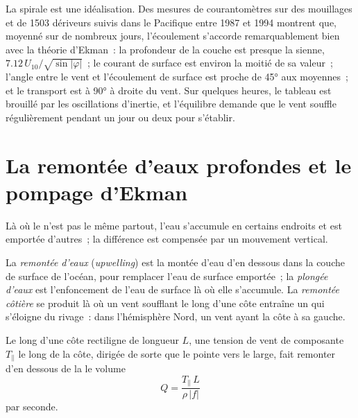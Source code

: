 La spirale est une idéalisation. Des mesures de courantomètres sur des mouillages et
de 1503 dériveurs suivis dans le Pacifique entre 1987 et 1994 montrent que, moyenné
sur de nombreux jours, l'écoulement s'accorde remarquablement bien avec la théorie d'Ekman~: la profondeur de la
couche est presque la sienne, $7.12\,U_{10}/\sqrt{\sin|\varphi|}$~; le courant de surface est
environ la moitié de sa valeur~; l'angle entre le vent et l'écoulement de surface est proche de
\ang{45} aux  moyennes~; et le transport est à \ang{90} à droite du vent.
Sur quelques heures, le tableau est brouillé par les oscillations d'inertie, et l'équilibre
demande que le vent souffle régulièrement pendant un jour ou deux pour s'établir.

\section{La remontée d'eaux profondes et le pompage d'Ekman}\label{sec:b1:ocean-circulation:upwelling}

Là où le  n'est pas le même partout, l'eau s'accumule en certains endroits
et est emportée d'autres~; la différence est compensée par un mouvement vertical.

\begin{definition}\label{def:b1:ocean-circulation:upwelling}
La \emph{remontée d'eaux} (\textit{upwelling}) est la montée d'eau d'en dessous dans la couche de surface
de l'océan, pour remplacer l'eau de surface emportée~; la \emph{plongée d'eaux}%
 est l'enfoncement de l'eau de surface là où elle s'accumule.
La \emph{remontée côtière} se produit là où un vent soufflant le long
d'une côte entraîne un  qui s'éloigne du rivage~: dans l'hémisphère Nord,
un vent ayant la côte à sa gauche.
\end{definition}

\begin{proposition}\label{prop:b1:ocean-circulation:coastal}
Le long d'une côte rectiligne de longueur $L$, une tension de vent de composante $T_\parallel$
le long de la côte, dirigée de sorte que le  pointe vers le large, fait remonter
d'en dessous de la  le volume
\[
  Q = \frac{T_\parallel\,L}{\rho\,|f|}
\]
par seconde.
\end{proposition}


